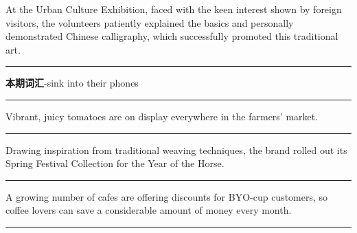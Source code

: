 \documentclass[11pt,a4paper]{article}
\newcommand{\num}[1]{\makebox[1.9em][r]{#1.}\hspace{0.3em}}
\newcommand{\wline}{\noindent\rule{\linewidth}{0.4pt}}
\begin{document}
\begin{minipage}{\linewidth}

\num{25}At the Urban Culture Exhibition, faced with the keen interest shown by foreign visitors, the volunteers patiently explained the basics and personally demonstrated Chinese calligraphy, which successfully promoted this traditional art.

\vspace{0.25em}

\wline

\end{minipage}

\num{26}\textbf{本期词汇}\quad -sink into their phones

\vspace{0.25em}

\wline

\vspace{0.35em}\vspace{0.15em}

\begin{minipage}{\linewidth}

\num{27}Vibrant, juicy tomatoes are on display everywhere in the farmers’ market.

\vspace{0.25em}

\wline

\end{minipage}

\begin{minipage}{\linewidth}

\num{28}Drawing inspiration from traditional weaving techniques, the brand rolled out its Spring Festival Collection for the Year of the Horse.

\vspace{0.25em}

\wline

\end{minipage}

\begin{minipage}{\linewidth}

\num{29}A growing number of cafes are offering discounts for BYO-cup customers, so coffee lovers can save a considerable amount of money every month.

\vspace{0.25em}

\wline

\end{minipage}
\end{document}
